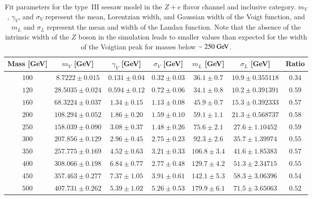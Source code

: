 \begin{appendices}
\begin{table}[h]
 \centering
\scriptsize
 \begin{tabular}{|c||c|c|c|c|c|c|}  
 \hline\hline
Mass [GeV] & $m_V$ [GeV] &  $\gamma_V$ [GeV] &  $\sigma_V$ [GeV] & $m_L$  [GeV] & $\sigma_L$ [GeV] & Ratio\\
\hline \hline
$100 $&$ 8.7222   \pm0.015 $&$ 0.131 \pm0.04 $&$ 0.32\pm0.03 $&$ 36.1\pm0.7 $&$ 10.9\pm0.355118 $&$ 0.34$ \\ 
$120 $&$ 28.5035 \pm0.024 $&$ 0.594\pm0.12 $&$ 0.72\pm0.06 $&$ 34.1\pm0.8 $&$ 10.2\pm0.391391 $&$ 0.59$ \\
$160 $&$ 68.3224 \pm0.037 $&$ 1.34\pm0.15 $&$ 1.13\pm0.08 $&$ 45.9\pm0.7 $&$ 15.3\pm0.392333 $&$ 0.57 $\\
$200 $&$ 108.294 \pm0.052 $&$ 1.86\pm0.20 $&$ 1.59\pm0.10 $&$ 59.1\pm1.1 $&$ 21.3\pm0.568737 $&$ 0.58 $\\
$250 $&$ 158.039 \pm0.090 $&$ 3.08\pm0.37 $&$ 1.48\pm0.26 $&$ 75.6\pm2.1 $&$ 27.6\pm1.10452 $&$ 0.59$ \\ 
$300 $&$ 207.856 \pm0.129 $&$ 2.96\pm0.45 $&$ 2.75\pm0.23 $&$ 92.3\pm2.6 $&$ 35.7\pm1.39974 $&$ 0.55 $\\ 
$350 $&$ 257.775\pm0.169 $&$ 4.52\pm0.63 $&$ 3.21\pm0.33 $&$ 106.8\pm3.4 $&$ 41.6\pm1.85383 $&$ 0.57$ \\ 
$400 $&$ 308.066\pm0.198 $&$ 6.84\pm0.77 $&$ 2.77\pm0.48 $&$ 129.7\pm4.2 $&$ 51.3\pm2.34715 $&$ 0.55 $\\ 
$450 $&$ 357.463\pm0.277 $&$ 7.37\pm1.05 $&$ 3.91\pm0.61 $&$ 142.1\pm5.3 $&$ 58.3\pm3.06396 $&$ 0.54$ \\ 
$500 $&$ 407.731\pm0.262 $&$ 5.39\pm1.02 $&$ 5.26\pm0.53 $&$ 179.9\pm6.1 $&$ 71.5\pm3.65063   $&$ 0.52 $ \\
\hline\hline
\end{tabular} 
\caption{Fit parameters for the type~III seesaw model in the $Z+e$ flavor channel and inclusive category. $m_V$, $\gamma_V$, and $\sigma_V$ represent the mean, Lorentzian width, and Gaussian width of the Voigt function, and $m_L$ and $\sigma_L$ represent the mean and width of the Landau function. Note that the absence of the intrinsic width of the $Z$ boson in the simulation leads to smaller values than expected for the width of the Voigtian peak for masses below $\sim250 \GeV$.}

   \label{table:ZeFitParamsSS}
\end{table}



\end{appendices}
